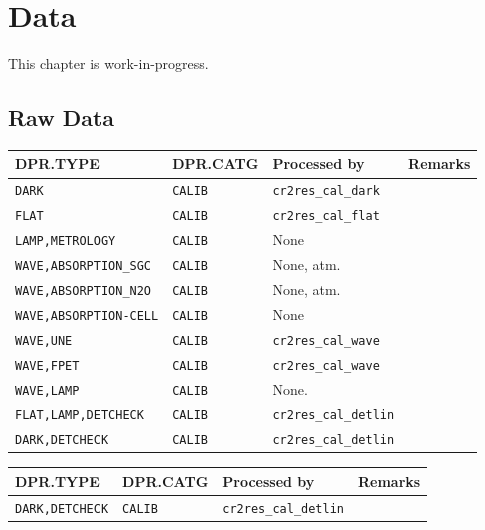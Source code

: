 \section{Data}
\label{sec:data}

This chapter is work-in-progress.


\subsection{Raw Data}

\begin{tabularx}{\linewidth}{|X|X|X|X|}
    \hline
    \multicolumn{1}{|l|}{\textbf{DPR.TYPE}} &
    \multicolumn{1}{l|}{\textbf{DPR.CATG}} &
    \multicolumn{1}{l|}{\textbf{Processed by}} &
    \multicolumn{1}{l|}{\textbf{Remarks}} \\
    \hline
    \texttt{DARK}                   & \texttt{CALIB} & \texttt{cr2res\_cal\_dark} & \\
    \texttt{FLAT}                   & \texttt{CALIB} & \texttt{cr2res\_cal\_flat} & \\
    \texttt{LAMP,METROLOGY}         & \texttt{CALIB} & None & \\
    \texttt{WAVE,ABSORPTION\_SGC}   & \texttt{CALIB} & None, atm. & \\
    \texttt{WAVE,ABSORPTION\_N2O}   & \texttt{CALIB} & None, atm. & \\
    \texttt{WAVE,ABSORPTION-CELL}   & \texttt{CALIB} & None & \\
    \texttt{WAVE,UNE}               & \texttt{CALIB} & \texttt{cr2res\_cal\_wave} & \\
    \texttt{WAVE,FPET}              & \texttt{CALIB} & \texttt{cr2res\_cal\_wave} & \\
    \texttt{WAVE,LAMP}              & \texttt{CALIB} & None. & \\
    \texttt{FLAT,LAMP,DETCHECK}     & \texttt{CALIB} & \texttt{cr2res\_cal\_detlin} & \\
    \texttt{DARK,DETCHECK}          & \texttt{CALIB} & \texttt{cr2res\_cal\_detlin} & \\
    \hline
\end{tabularx}
\label{tab:raw-calibs}


\begin{tabularx}{\linewidth}{|X|X|X|X|}
    \hline
    \multicolumn{1}{|l|}{\textbf{DPR.TYPE}} &
    \multicolumn{1}{l|}{\textbf{DPR.CATG}} &
    \multicolumn{1}{l|}{\textbf{Processed by}} &
    \multicolumn{1}{l|}{\textbf{Remarks}} \\
    \hline
    \texttt{DARK,DETCHECK}          & \texttt{CALIB} & \texttt{cr2res\_cal\_detlin} & \\
    \hline
\end{tabularx}
\label{tab:raw-science}


